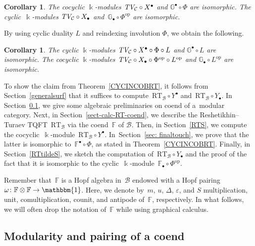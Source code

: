 \documentclass[10pt,a4paper]{amsart}
\numberwithin{equation}{section}
\newtheorem{Corollary}[Theorem]{Corollary}
\newcommand{\co}{\colon}
\newcommand{\mc}{\mathcal}
\newcommand{\opp}{\mathrm{op}}
\newcommand{\kk}{\Bbbk}
\newcommand{\uu}{\mathbbm{1}}
\newcommand{\RT}{\text{RT}}
\newcommand{\TV}{\text{TV}}
\newcommand{\coend}{\mathbb{F}}
\newcommand{\coendzc}{\mathbb{G}}
\begin{document}
\begin{Corollary}%
	The cocyclic $\kk$-modules $\emph{\TV}_{\mc C} \circ X^\bullet$ and $\coendzc^\bullet \circ \Phi$ are isomorphic. The cyclic~$\kk$-modules $\emph{\TV}_{\mc C} \circ X_\bullet$ and~$\coendzc_\bullet \circ \Phi^{\opp}$ are isomorphic.
\end{Corollary}
By using cyclic duality $L$ and reindexing involution $\Phi$, we obtain the following.

\begin{Corollary}
	The cyclic $\kk$-modules $\emph{\TV}_{\mc C} \circ X^\bullet \circ \Phi \circ L$ and $\coendzc^\bullet \circ L$ are isomorphic. The cocyclic $\kk$-modules $\emph{\TV}_{\mc C} \circ X_\bullet \circ \Phi^{\opp} \circ L^\opp$ and $\coendzc_\bullet \circ L^\opp$ are isomorphic.
\end{Corollary}

To show the claim from Theorem~\ref{CYCINCOBRT}, it follows from Section~\ref{generalsurf} that it suffices to compute~$\RT_\mc B\circ Y^\bullet$ and~$\RT_\mc B\circ Y_\bullet$. In Section~\ref{sect-modul-coend}, we give some algebraic preliminaries on coend of a~modular category. Next, in Section~\ref{sect-calc-RT-coend}, we describe the Reshetikhin--Turaev TQFT~$\RT_{\mc B}$ via the coend~$\coend$ of $\mc B$. Then, in Section~\ref{RTS}, we compute the cocyclic~$\kk$-module~$\RT_{\mc B}\circ Y^\bullet$.
In~Section~\ref{sec: finaltouch}, we prove that the latter is isomorphic to~$\coend^\bullet \circ \Phi$, as stated in Theorem~\ref{CYCINCOBRT}.
Finally, in Section~\ref{RTtildeS}, we sketch the computation of~$\RT_{\mc B}\circ Y_\bullet$ and the proof of the fact that it is isomorphic to the cyclic~$\kk$-module~$\coend_\bullet \circ \Phi^{\opp}$.

Remember that~$\coend$ is a Hopf algebra in~$\mc B$ endowed with a Hopf pairing~$\omega \co \coend \otimes \coend \to \uu$.
Here, we denote by~$m$, $u$, $\Delta$, $\varepsilon$, and $S$ multiplication, unit, comultiplication, counit, and antipode of~$\coend$, respectively. In what follows, we will often drop the notation of~$\coend$ while using graphical calculus.


\subsection{Modularity and pairing of a coend}\label{sect-modul-coend}
\end{document}
